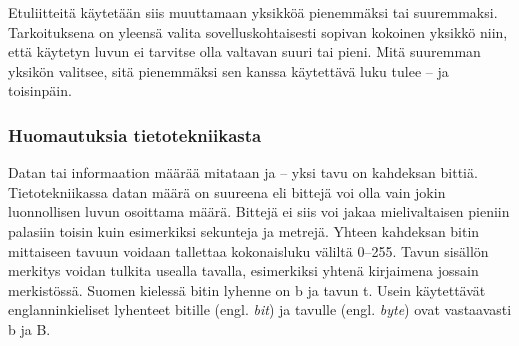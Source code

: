 Etuliitteitä käytetään siis muuttamaan yksikköä pienemmäksi tai suuremmaksi. Tarkoituksena on yleensä valita sovelluskohtaisesti sopivan kokoinen yksikkö niin, että käytetyn luvun ei tarvitse olla valtavan suuri tai pieni. Mitä suuremman yksikön valitsee, sitä pienemmäksi sen kanssa käytettävä luku tulee -- ja toisinpäin.

\begin{esimerkki}
\end{esimerkki}

\subsubsection*{Huomautuksia tietotekniikasta}

Datan tai informaation määrää mitataan  ja  -- yksi tavu on kahdeksan bittiä. Tietotekniikassa datan määrä on suureena  eli bittejä voi olla vain jokin luonnollisen luvun osoittama määrä. Bittejä ei siis voi jakaa mielivaltaisen pieniin palasiin toisin kuin esimerkiksi sekunteja ja metrejä. Yhteen kahdeksan bitin mittaiseen tavuun voidaan tallettaa kokonaisluku väliltä 0--255. Tavun sisällön merkitys voidan tulkita usealla tavalla, esimerkiksi yhtenä kirjaimena jossain merkistössä. Suomen kielessä bitin lyhenne on b ja tavun t. Usein käytettävät englanninkieliset lyhenteet bitille (engl. \textit{bit}) ja tavulle (engl. \textit{byte}) ovat vastaavasti b ja B.

